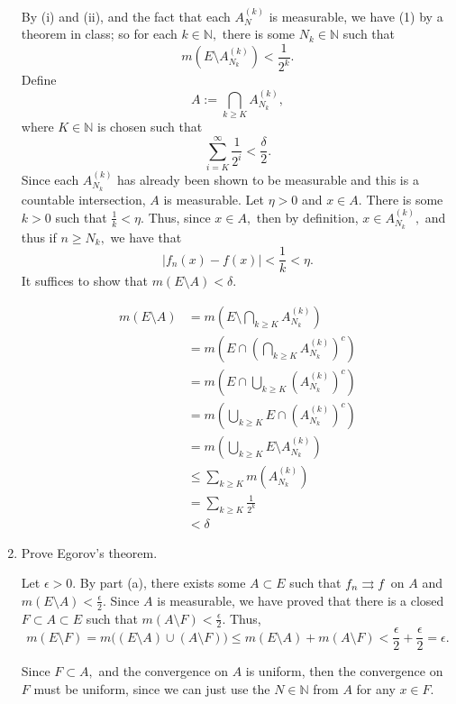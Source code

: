\documentclass[11pt]{article}
\newcommand{\bbN}{\mathbb{N}}
\newcommand{\sm}{\setminus}
\begin{document}
\begin{enumerate}
\begin{solution}
        By (i) and (ii), and the fact that each $A_N^{(k)}$ is measurable, we have (1) by a theorem in class; so for each $k\in \bbN,$ there is some $N_{k}  \in \bbN$ such that
        \[m(E\sm A_{N_{k}}^{(k)}) < \frac{1}{2^k}.\] Define 
        \[A:= \bigcap_{k \geq K} A_{N_k}^{(k)},\] where $K \in \bbN$ is chosen such that 
        \[\sum_{i = K}^\infty \frac{1}{2^i} < \frac{\delta}{2}.\] Since each $A_{N_k}^{(k)}$ has already been shown to be measurable and this is a countable intersection, $A$ is measurable.
        Let $\eta >0$ and $x\in A.$ There is some $k>0$ such that $\frac{1}{k}< \eta.$ Thus, since $x\in A,$ then by definition, $x \in A_{N_k}^{(k)},$ and thus if $n\geq N_k,$ we have that 
        \[|f_n(x) - f(x)| < \frac{1}{k}< \eta.\] It suffices to show that $m(E \sm A) < \delta.$ 

        \begin{align*}
            m(E\sm A) &= m\left(E\sm \bigcap_{k\geq K}A_{N_k}^{(k)}\right)\\
            &= m\left(E \cap \left(\bigcap_{k\geq K}A_{N_k}^{(k)}\right)^c\right)\\
            &= m\left(E \cap \bigcup_{k\geq K}(A_{N_k}^{(k)})^c\right)\\
            &= m\left(\bigcup_{k\geq K}E \cap (A_{N_k}^{(k)})^c \right)\\
            &= m\left(\bigcup_{k\geq K} E\sm A_{N_k}^{(k)}\right)\\
            &\leq \sum_{k\geq K} m(A_{N_k}^{(k)})\\
            &= \sum_{k\geq K} \frac{1}{2^k}\\
            &< \delta
        \end{align*}
    \end{solution}
    \item Prove Egorov's theorem.
    \begin{solution}
        Let $\epsilon>0.$ By part (a), there exists some $A\subset E$ such that  $f_n \overset{}{\rightrightarrows} f$ on $A$ and $m(E\sm A) < \frac{\epsilon}{2}.$ Since $A$ is measurable, we have proved that there is a closed $F \subset A\subset E$ such that $m(A\sm F) < \frac{\epsilon}{2}.$ Thus, 
        \[m(E\sm F)= m\big((E \sm A) \cup (A \sm F)\big) \leq m(E\sm A) + m(A\sm F) < \frac{\epsilon}{2} + \frac{\epsilon}{2} = \epsilon.\] 

        Since $F\subset A,$ and the convergence on $A$ is uniform, then the convergence on $F$ must be uniform, since we can just use the $N \in \bbN$ from $A$ for any $x\in F.$
    \end{solution}
\end{enumerate}
\end{document}
